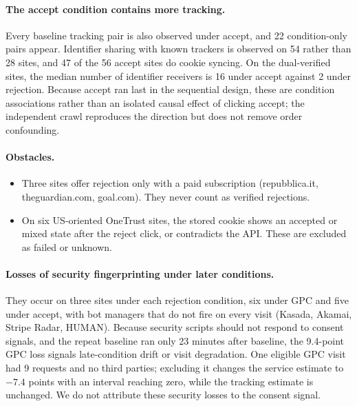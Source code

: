 \documentclass[sigconf,review,anonymous]{acmart}
\begin{document}
\paragraph{The accept condition contains more tracking.} Every baseline tracking pair is also
observed under accept, and 22 condition-only pairs appear. Identifier sharing with known
trackers is observed on 54 rather than 28 sites, and 47 of the 56 accept sites do cookie syncing.
On the dual-verified sites, the median number of identifier receivers is 16 under accept against
2 under rejection. Because accept ran last in the sequential design, these are condition
associations rather than an isolated causal effect of clicking accept; the independent crawl
reproduces the direction but does not remove order confounding.

\paragraph{Obstacles.}
\begin{itemize}
\item Three sites offer rejection only with a paid subscription (repubblica.it, theguardian.com,
  goal.com). They never count as verified rejections.
\item On six US-oriented OneTrust sites, the stored cookie shows an accepted or mixed state after
  the reject click, or contradicts the API. These are excluded as failed or unknown.
\end{itemize}

\paragraph{Losses of security fingerprinting under later conditions.} They occur on three sites
under each rejection condition, six under GPC and five under accept, with bot managers that do
not fire on every visit (Kasada, Akamai, Stripe Radar, HUMAN). Because security scripts should
not respond to consent signals, and the repeat baseline ran only 23 minutes after baseline, the
9.4-point GPC loss signals late-condition drift or visit degradation. One eligible GPC visit had
9 requests and no third parties; excluding it changes the service estimate to $-7.4$ points with
an interval reaching zero, while the tracking estimate is unchanged. We do not attribute these
security losses to the consent signal.
\end{document}
